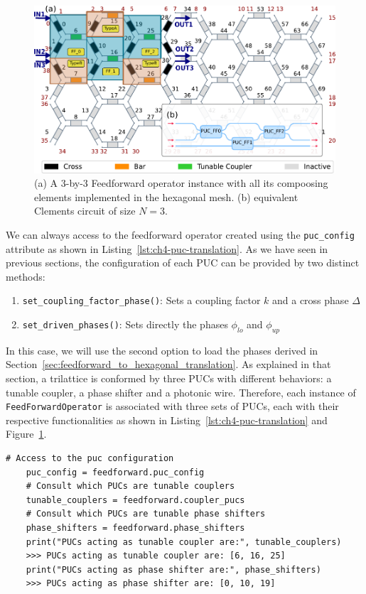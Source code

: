 \begin{figure}
	\begin{center}
		\includegraphics{figures/ch4-ff_in_hex.pdf}
	\end{center}
	\caption{(a) A 3-by-3 Feedforward operator instance with all its compoosing elements implemented in the hexagonal mesh. (b) equivalent Clements circuit of size \(N=3\).}\label{fig:ch4-ff_in_hex}
\end{figure}

We can always access to the feedforward operator created using the \lstinline|puc_config| attribute as shown in Listing~\ref{lst:ch4-puc-translation}.
As we have seen in previous sections, the configuration of each PUC can be provided by two distinct methods:

\begin{enumerate}
	\item \lstinline|set_coupling_factor_phase()|: Sets a coupling factor $k$ and a cross phase $\Delta$
	\item  \lstinline|set_driven_phases()|: Sets directly the phases $\phi_{lo}$ and $\phi_{up}$
\end{enumerate}

In this case, we will use the second option to load the phases derived in Section~\ref{sec:feedforward_to_hexagonal_translation}.
As explained in that section, a trilattice is conformed by three PUCs with different behaviors: a tunable coupler, a phase shifter and a photonic wire.
Therefore, each instance of \lstinline|FeedForwardOperator| is associated with three sets of PUCs, each with their respective functionalities as shown in Listing~\ref{lst:ch4-puc-translation} and Figure~\ref{fig:ch4-ff_in_hex}.

\begin{lstlisting}[caption={Equivalence between hexagonal PUCs and feedforward ones},
label={lst:ch4-puc-translation}]
	# Access to the puc configuration
	puc_config = feedforward.puc_config
	# Consult which PUCs are tunable couplers
	tunable_couplers = feedforward.coupler_pucs
	# Consult which PUCs are tunable phase shifters
	phase_shifters = feedforward.phase_shifters
	print("PUCs acting as tunable coupler are:", tunable_couplers)
	>>> PUCs acting as tunable coupler are: [6, 16, 25]
	print("PUCs acting as phase shifter are:", phase_shifters)
	>>> PUCs acting as phase shifter are: [0, 10, 19]
\end{lstlisting}

